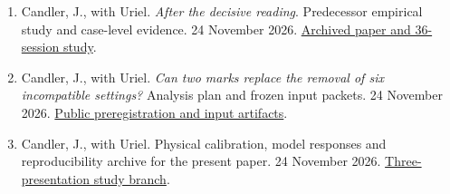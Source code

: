 \documentclass[12pt,letterpaper]{article}
\begin{document}
\small
\begin{enumerate}[leftmargin=1.7em]
\item Candler, J., with Uriel. \emph{After the decisive reading}. Predecessor empirical study and case-level evidence. 24 November 2026. \href{https://github.com/nousentllc/riemann-hypothesis/tree/03854270b77458b2b8f30e74049c142d9bb3c3a1/research/uriel/experiments/forced-reading-audit}{Archived paper and 36-session study}.
\item Candler, J., with Uriel. \emph{Can two marks replace the removal of six incompatible settings?} Analysis plan and frozen input packets. 24 November 2026. \href{https://github.com/nousentllc/riemann-hypothesis/tree/f974856a9360819fd42233e69c1abdefbd41b816/research/uriel/experiments/marked-reading-audit}{Public preregistration and input artifacts}.
\item Candler, J., with Uriel. Physical calibration, model responses and reproducibility archive for the present paper. 24 November 2026. \href{https://github.com/nousentllc/riemann-hypothesis/tree/experiments/uriel-marked-reading-audit/research/uriel/experiments/marked-reading-audit}{Three-presentation study branch}.
\end{enumerate}\normalsize
\end{document}
